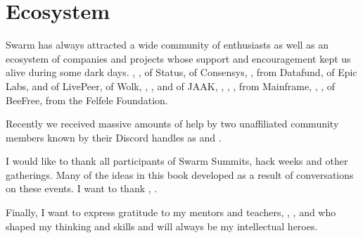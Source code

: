 \section*{Ecosystem}

Swarm has always attracted a wide community of enthusiasts as well as an ecosystem of companies and projects whose support and encouragement kept us alive during some dark days. 
, ,  of Status,  of Consensys, ,  from Datafund,  of Epic Labs,  and  of LivePeer,  of Wolk, , ,  and  of JAAK, , , ,  from Mainframe, , ,  of BeeFree,  from the  Felfele Foundation. 

Recently we received massive amounts of help by two unaffiliated community members known by their Discord handles as  and .

I would like to thank all participants of Swarm Summits, hack weeks and other gatherings. Many of the ideas in this book developed as a result of conversations on these events. I want to thank , .

Finally, I want to express gratitude to my mentors and teachers, , ,  and  who shaped my thinking and skills and will always be my intellectual heroes.

